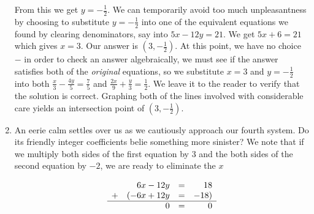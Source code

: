 \begin{ex}
\begin{enumerate}
From this we get $y = -\frac{1}{2}$.  We can temporarily avoid too much unpleasantness by choosing to substitute $y = -\frac{1}{2}$ into one of the equivalent equations we found by clearing denominators, say into $5x - 12y  =  21$.  We get $5x + 6 = 21$ which gives $x=3$.  Our answer is $\left(3, -\frac{1}{2}\right)$.  At this point, we have no choice $-$ in order to check an answer algebraically, we must see if the answer satisfies both of the \textit{original} equations, so we substitute $x = 3$ and $y = -\frac{1}{2}$ into both $\frac{x}{3} -\frac{4y}{5} = \frac{7}{5}$ and $\frac{2x}{9} + \frac{y}{3} = \frac{1}{2}$.  We leave it to the reader to verify that the solution is correct.  Graphing both of the lines involved with considerable care yields an intersection point of $\left(3, -\frac{1}{2}\right)$.  


\item  An eerie calm settles over us as we cautiously approach our fourth system.  Do its friendly integer coefficients belie something more sinister?  We note that if we multiply both sides of the first equation by $3$ and the both sides of the second equation by $-2$, we are ready to eliminate the $x$ 

\setlength{\extrarowheight}{2pt}
\[ \begin{array}{lrcr} & 6x-12y & = & 18  \\ + & (-6x+12y  & = & -18 ) \\ \hline  & 0 & = & 0\end{array}\] 
\setlength{\extrarowheight}{0pt}


\end{enumerate}
\end{ex}
